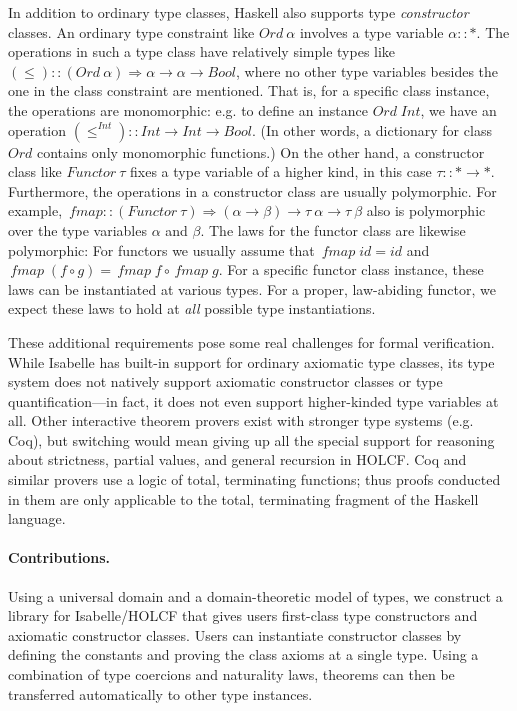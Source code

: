 \documentclass{sigplanconf}
\newcommand{\To}{\mathbin{\Rightarrow}}
\newcommand{\hsc}[1]{\ensuremath{\mathit{#1}}}
\newcommand{\hsid}{\hsc{id}}
\newcommand{\fmap}{\,\hsc{fmap}} %
\newcommand{\tA}{\alpha}
\newcommand{\tB}{\beta}
\newcommand{\tT}{\tau}
\theoremstyle{definition}
\begin{document}
In addition to ordinary type classes, Haskell also supports type \emph{constructor} classes. An ordinary type constraint like $\hsc{Ord}\:\tA$ involves a type variable $\tA :: *$. The operations in such a type class have relatively simple types like $(\le) :: (\hsc{Ord}\:\tA) \To \tA \to \tA \to \hsc{Bool}$, where no other type variables besides the one in the class constraint are mentioned. That is, for a specific class instance, the operations are monomorphic: e.g. to define an instance $\hsc{Ord}\;\hsc{Int}$, we have an operation $(\le^\hsc{Int}) :: \hsc{Int} \to \hsc{Int} \to \hsc{Bool}$. (In other words, a dictionary for class \hsc{Ord} contains only monomorphic functions.) On the other hand, a constructor class like $\hsc{Functor}\:\tT$ fixes a type variable of a higher kind, in this case $\tT :: * \to *$. Furthermore, the operations in a constructor class are usually polymorphic. For example, $\fmap :: (\hsc{Functor}\:\tT) \To (\tA \to \tB) \to \tT\:\tA \to \tT\:\tB$ also is polymorphic over the type variables $\tA$ and $\tB$. The laws for the functor class are likewise polymorphic: For functors we usually assume that $\fmap\;\hsid = \hsid$ and $\fmap\;(f \circ g) = \fmap\;f \circ \fmap\;g$. For a specific functor class instance, these laws can be instantiated at various types. For a proper, law-abiding functor, we expect these laws to hold at \emph{all} possible type instantiations.

These additional requirements pose some real challenges for formal verification. While Isabelle has built-in support for ordinary axiomatic type classes, its type system does not natively support axiomatic constructor classes or type quantification---in fact, it does not even support higher-kinded type variables at all. Other interactive theorem provers exist with stronger type systems (e.g. Coq), but switching would mean giving up all the special support for reasoning about strictness, partial values, and general recursion in HOLCF. Coq and similar provers use a logic of total, terminating functions; thus proofs conducted in them are only applicable to the total, terminating fragment of the Haskell language.

\paragraph{Contributions.}

Using a universal domain and a domain-theoretic model of types, we construct a library for Isabelle/HOLCF that gives users first-class type constructors and axiomatic constructor classes. Users can instantiate constructor classes by defining the constants and proving the class axioms at a single type. Using a combination of type coercions and naturality laws, theorems can then be transferred automatically to other type instances.
\end{document}
